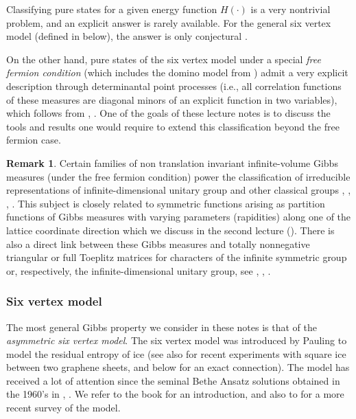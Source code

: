 \documentclass[letterpaper,11pt,oneside,reqno]{article}
\numberwithin{equation}{section}
\theoremstyle{definition}
\newtheorem{remark}[proposition]{Remark}
\theoremstyle{remark}
\begin{document}
Classifying pure states for a given energy function $H(\cdot)$ is a very
nontrivial problem, and an 
explicit answer is rarely available. 
For the general six vertex model 
(defined in  below),
the answer is only conjectural
\cite{reshetikhin2010lectures}.

On the other hand, pure states of the six vertex model 
under a special
\emph{free fermion condition}
(which includes the domino model from )
admit a very explicit description through
determinantal point processes 
(i.e., all correlation functions
of these measures are diagonal minors
of an explicit function in two variables),
which follows from
\cite{Sheffield2008}, 
\cite{KOS2006}.
One of the goals of these lecture notes is to discuss 
the tools and results one would require to extend this classification
beyond the free fermion case.


\begin{remark}
	\label{rmk:inf_Gibbs}
	Certain families of 
	non translation invariant
	infinite-volume
	Gibbs measures (under the free fermion condition)
	power the
	classification of irreducible representations of
	infinite-dimensional unitary group
	and other classical groups
	\cite{Voiculescu1976},
	\cite{VK82CharactersU},
	\cite{BorodinOlsh2011GT},
	\cite{Petrov2012GT}.
	This subject is closely related to symmetric
	functions arising as partition functions
	of Gibbs measures with 
	varying parameters (rapidities)
	along one of the lattice coordinate
	direction which we discuss in the second lecture ().
	There is also a direct link between these Gibbs measures and totally nonnegative triangular or
	full Toeplitz matrices for characters of the infinite
	symmetric group or, respectively, the
	infinite-dimensional unitary group, see \cite{AESW51},
	\cite{Edrei53}, \cite{Boyer1983}.
\end{remark}

\subsubsection{Six vertex model}
\label{subsub:6v_model}

The most general Gibbs property we consider in these notes is that of the 
\emph{asymmetric six vertex model}. 
The six vertex model 
was introduced by Pauling to model
the residual entropy of ice \cite{pauling1935structure}
(see also 
\cite{Nature_square_ice}
for recent experiments
with square ice between two graphene sheets, and  below for an exact connection).
The model
has received a lot of attention since the seminal Bethe Ansatz solutions obtained in the 1960's in
\cite{Lieb1967SixVertex}, \cite{YangYang1966}.
We refer to the book 
\cite{baxter2007exactly} for an introduction, and also to
\cite{reshetikhin2010lectures} for a more recent survey of the 
model.
\end{document}
